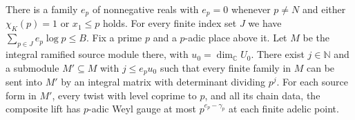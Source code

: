 \begin{lemma}
\label{lem:a-uniform-divisibility}
\emitthmsource
There is a family $e_p$ of nonnegative reals with $e_p=0$ whenever $p\ne N$ and either $\chi_K(p)=1$ or $x_1\le p$ holds. For every finite index set $J$ we have $\sum_{p\in J}e_p\log p\le B$. Fix a prime $p$ and a $p$-adic place above it. Let $M$ be the integral ramified source module there, with $u_0=\dim_{\mathbb C}U_0$. There exist $j\in\mathbb N$ and a submodule $M'\subseteq M$ with $j\le e_pu_0$ such that every finite family in $M$ can be sent into $M'$ by an integral matrix with determinant dividing $p^j$. For each source form in $M'$, every twist with level coprime to $p$, and all its chain data, the composite lift has $p$-adic Weyl gauge at most $p^{e_p-\gamma_p}$ at each finite adelic point.
\end{lemma}
